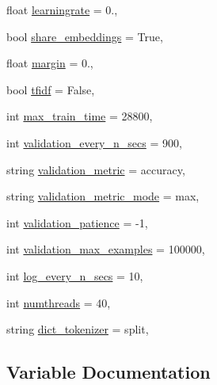 \begin{DoxyCompactItemize}
float \hyperlink{namespacekvmemnn_1_1train_a5579d8d5bb9ee21b5f153f5737439cdd}{learningrate} = 0.,
\item 
bool \hyperlink{namespacekvmemnn_1_1train_aee2de861c3cf276c1ab32ebd5580d61b}{share\+\_\+embeddings} = True,
\item 
float \hyperlink{namespacekvmemnn_1_1train_a3f7195812dd2eb6f62036a60f9f87f70}{margin} = 0.,
\item 
bool \hyperlink{namespacekvmemnn_1_1train_a20c3901d03823ace6a020302458eced8}{tfidf} = False,
\item 
int \hyperlink{namespacekvmemnn_1_1train_a86643a72464ae12c9c421acafa0af263}{max\+\_\+train\+\_\+time} = 28800,
\item 
int \hyperlink{namespacekvmemnn_1_1train_aa79584a93a7078f01120d340777375aa}{validation\+\_\+every\+\_\+n\+\_\+secs} = 900,
\item 
string \hyperlink{namespacekvmemnn_1_1train_a4c15daa1ca93b1aad51f7a0dbd793af9}{validation\+\_\+metric} = \textquotesingle{}accuracy\textquotesingle{},
\item 
string \hyperlink{namespacekvmemnn_1_1train_a0d65ef7312ee19cd54bd85a02be27dbe}{validation\+\_\+metric\+\_\+mode} = \textquotesingle{}max\textquotesingle{},
\item 
int \hyperlink{namespacekvmemnn_1_1train_acc0909255294aaa667d7e7b0b3de1ae6}{validation\+\_\+patience} = -\/1,
\item 
int \hyperlink{namespacekvmemnn_1_1train_ae5e882771eefca3bb0f074cc67e1b9db}{validation\+\_\+max\+\_\+examples} = 100000,
\item 
int \hyperlink{namespacekvmemnn_1_1train_aeb9ea9737ced97f6ce66d652f3092a69}{log\+\_\+every\+\_\+n\+\_\+secs} = 10,
\item 
int \hyperlink{namespacekvmemnn_1_1train_a3e923c01d54806105d4bf273e071a90e}{numthreads} = 40,
\item 
string \hyperlink{namespacekvmemnn_1_1train_a11d703d08ba927ee4fa1af41482a43c2}{dict\+\_\+tokenizer} = \textquotesingle{}split\textquotesingle{},
\end{DoxyCompactItemize}


\subsection{Variable Documentation}
\mbox{\label{namespacekvmemnn_1_1train_ae9856540daf7f37b0fea5722e42acbb2}} 
